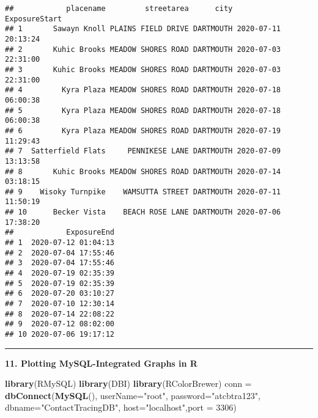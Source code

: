 \documentclass[
]{article}
\newenvironment{Shaded}{\begin{snugshade}}{\end{snugshade}}
\newcommand{\DataTypeTok}[1]{\textcolor[rgb]{0.13,0.29,0.53}{#1}}
\newcommand{\DecValTok}[1]{\textcolor[rgb]{0.00,0.00,0.81}{#1}}
\newcommand{\KeywordTok}[1]{\textcolor[rgb]{0.13,0.29,0.53}{\textbf{#1}}}
\newcommand{\NormalTok}[1]{#1}
\newcommand{\StringTok}[1]{\textcolor[rgb]{0.31,0.60,0.02}{#1}}
\begin{document}
\begin{verbatim}
##            placename         streetarea      city       ExposureStart
## 1       Sawayn Knoll PLAINS FIELD DRIVE DARTMOUTH 2020-07-11 20:13:24
## 2       Kuhic Brooks MEADOW SHORES ROAD DARTMOUTH 2020-07-03 22:31:00
## 3       Kuhic Brooks MEADOW SHORES ROAD DARTMOUTH 2020-07-03 22:31:00
## 4         Kyra Plaza MEADOW SHORES ROAD DARTMOUTH 2020-07-18 06:00:38
## 5         Kyra Plaza MEADOW SHORES ROAD DARTMOUTH 2020-07-18 06:00:38
## 6         Kyra Plaza MEADOW SHORES ROAD DARTMOUTH 2020-07-19 11:29:43
## 7  Satterfield Flats     PENNIKESE LANE DARTMOUTH 2020-07-09 13:13:58
## 8       Kuhic Brooks MEADOW SHORES ROAD DARTMOUTH 2020-07-14 03:18:15
## 9    Wisoky Turnpike    WAMSUTTA STREET DARTMOUTH 2020-07-11 11:50:19
## 10      Becker Vista    BEACH ROSE LANE DARTMOUTH 2020-07-06 17:38:20
##            ExposureEnd
## 1  2020-07-12 01:04:13
## 2  2020-07-04 17:55:46
## 3  2020-07-04 17:55:46
## 4  2020-07-19 02:35:39
## 5  2020-07-19 02:35:39
## 6  2020-07-20 03:10:27
## 7  2020-07-10 12:30:14
## 8  2020-07-14 22:08:22
## 9  2020-07-12 08:02:00
## 10 2020-07-06 19:17:12
\end{verbatim}

\begin{center}\rule{0.5\linewidth}{0.5pt}\end{center}

\textbf{11. Plotting MySQL-Integrated Graphs in R}

\begin{Shaded}
\begin{Highlighting}[]
\KeywordTok{library}\NormalTok{(RMySQL)}
\KeywordTok{library}\NormalTok{(DBI)}
\KeywordTok{library}\NormalTok{(RColorBrewer)}
\NormalTok{conn =}\StringTok{ }\KeywordTok{dbConnect}\NormalTok{(}\KeywordTok{MySQL}\NormalTok{(), }\DataTypeTok{userName=}\StringTok{"root"}\NormalTok{, }\DataTypeTok{password=}\StringTok{"atcbtra123"}\NormalTok{, }\DataTypeTok{dbname=}\StringTok{"ContactTracingDB"}\NormalTok{, }\DataTypeTok{host=}\StringTok{"localhost"}\NormalTok{,}\DataTypeTok{port =} \DecValTok{3306}\NormalTok{)}
\end{Highlighting}
\end{Shaded}
\end{document}
